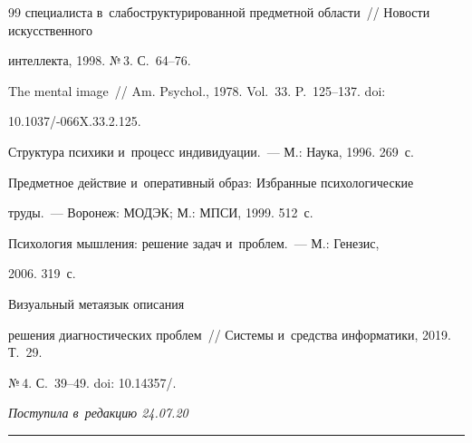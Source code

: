 {{\begin{thebibliography}{99}
специалиста в~слабоструктурированной предметной области~/\!\!/ Новости искусственного 

интеллекта, 1998. №\,3. С.~64--76.


 The mental image~/\!\!/ Am. Psychol., 1978. Vol.~33. P.~125--137. doi: 

10.1037\!/-066X.33.2.125.


 Структура психики и~процесс индивидуации.~--- М.: Наука, 1996. 269~с.


 Предметное действие и~оперативный образ: Избранные психологические 

труды.~--- Воронеж: МОДЭК; М.: МПСИ, 1999. 512~с.


 Психология мышления: решение задач и~проблем.~--- М.: Генезис, 

2006. 319~с.


 Визуальный метаязык описания 

решения диагностических проблем~/\!\!/ Системы и~средства информатики, 2019. Т.~29. 

№\,4. С.~39--49. doi: 10.14357\!/.

    \end{thebibliography}

} }





\vspace*{-6pt}



\hfill{\small\textit{Поступила в~редакцию 24.07.20}}









\vspace*{6pt}



\hrule



\vspace*{2pt}






